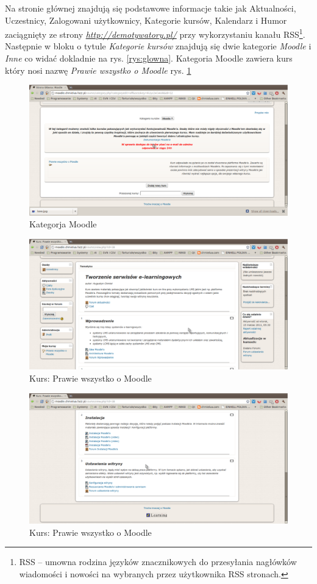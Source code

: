 Na stronie głównej znajdują się podstawowe informacje takie jak Aktualności, Uczestnicy, Zalogowani użytkownicy, Kategorie kursów, Kalendarz i Humor zaciągnięty ze strony \href{http://demotywatory.pl/}{\textit{http://demotywatory.pl/}} przy wykorzystaniu kanału RSS\footnote{RSS – umowna rodzina języków znacznikowych do przesyłania nagłówków wiadomości i nowości na wybranych przez użytkownika RSS stronach.}. Następnie w bloku o tytule \textit{Kategorie kursów} znajdują się dwie kategorie \textit{Moodle} i \textit{Inne} co widać dokladnie na rys. \ref{rys:glowna}. Kategoria Moodle zawiera kurs który nosi nazwę \textit{Prawie wszystko o Moodle} rys. \ref{rys:kurs}
\begin{figure}[!h]
	\centering
		\caption{Kategorja Moodle} \label{rys:kurs}
		\includegraphics[width=1\textwidth]{projekt_sys//rys//kurs.eps}
\end{figure}
\begin{figure}[!h]
	\centering
		\caption{Kurs: Prawie wszystko o Moodle} \label{rys:kurs_moodle}
		\includegraphics[width=1\textwidth]{projekt_sys//rys//kurs_moodle.eps}
\end{figure}
\begin{figure}[!h]
	\centering
		\caption{Kurs: Prawie wszystko o Moodle} \label{rys:kurs_moodle2}
		\includegraphics[width=1\textwidth]{projekt_sys//rys//kurs_moodle2.eps}
\end{figure}

